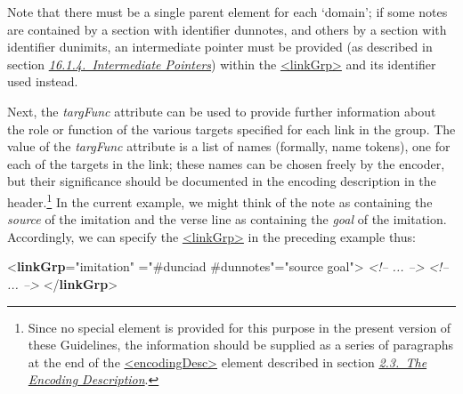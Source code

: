 Note that there must be a single parent element for each ‘domain’; if some notes are contained by a section with identifier dunnotes, and others by a section with identifier dunimits, an intermediate pointer must be provided (as described in section \textit{\hyperref[SAPTIP]{16.1.4.\ Intermediate Pointers}}) within the \hyperref[TEI.linkGrp]{<linkGrp>} and its identifier used instead.\par
Next, the {\itshape targFunc} attribute can be used to provide further information about the role or function of the various targets specified for each link in the group. The value of the {\itshape targFunc} attribute is a list of names (formally, name tokens), one for each of the targets in the link; these names can be chosen freely by the encoder, but their significance should be documented in the encoding description in the header.\footnote{Since no special element is provided for this purpose in the present version of these Guidelines, the information should be supplied as a series of paragraphs at the end of the \hyperref[TEI.encodingDesc]{<encodingDesc>} element described in section \textit{\hyperref[HD5]{2.3.\ The Encoding Description}}.} In the current example, we might think of the note as containing the \textit{source} of the imitation and the verse line as containing the \textit{goal} of the imitation. Accordingly, we can specify the \hyperref[TEI.linkGrp]{<linkGrp>} in the preceding example thus: \par\bgroup{}\exampleFont \begin{shaded}\noindent\mbox{}{<\textbf{linkGrp}\hspace*{1em}{type}="{imitation}"\mbox{}\newline 
\hspace*{1em}{domains}="{\#dunciad \#dunnotes}"\hspace*{1em}{targFunc}="{source goal}">}\mbox{}\newline 
{}\mbox{}\newline 
{}\mbox{}\newline 
\textit{<!-- ... -->}\mbox{}\newline 
{}\mbox{}\newline 
\textit{<!-- ... -->}\mbox{}\newline 
{</\textbf{linkGrp}>}\end{shaded}\egroup\par 
